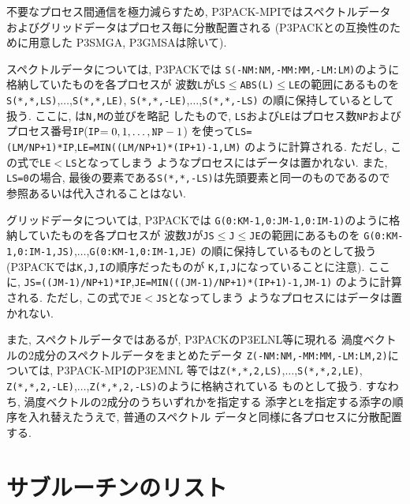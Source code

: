 \documentclass[a4j,fleqn]{jarticle}
\begin{document}
不要なプロセス間通信を極力減らすため, P3PACK-MPIではスペクトルデータ
およびグリッドデータはプロセス毎に分散配置される
(P3PACKとの互換性のために用意した P3SMGA, P3GMSAは除いて).

スペクトルデータについては, P3PACKでは
{\tt S(-NM:NM,-MM:MM,-LM:LM)}のように格納していたものを各プロセスが
波数{\tt L}が{\tt LS}$\le${\tt ABS(L)}$\le${\tt LE}の範囲にあるものを
{\tt S(*,*,LS)},$\ldots$,{\tt S(*,*,LE)},
{\tt S(*,*,-LE)},$\ldots$,{\tt S(*,*,-LS)}
の順に保持しているとして扱う. ここに, {\tt *}は{\tt N,M}の並びを略記
したもので, {\tt LS}および{\tt LE}はプロセス数{\tt NP}および
プロセス番号{\tt IP}({\tt IP}$=0,1,\ldots,{\tt NP}-1$)
を使って{\tt LS=(LM/NP+1)*IP},{\tt LE=MIN((LM/NP+1)*(IP+1)-1,LM)}
のように計算される. ただし, この式で{\tt LE}$<${\tt LS}となってしまう
ようなプロセスにはデータは置かれない. また, {\tt LS=0}の場合, 
最後の要素である{\tt S(*,*,-LS)}は先頭要素と同一のものであるので
参照あるいは代入されることはない.

グリッドデータについては, P3PACKでは
{\tt G(0:KM-1,0:JM-1,0:IM-1)}のように格納していたものを各プロセスが
波数{\tt J}が{\tt JS}$\le${\tt J}$\le${\tt JE}の範囲にあるものを
{\tt G(0:KM-1,0:IM-1,JS)},$\ldots$,{\tt G(0:KM-1,0:IM-1,JE)}
の順に保持しているものとして扱う(P3PACKでは{\tt K,J,I}の順序だったものが
{\tt K,I,J}になっていることに注意).
ここに,
{\tt JS=((JM-1)/NP+1)*IP},{\tt JE=MIN(((JM-1)/NP+1)*(IP+1)-1,JM-1)}
のように計算される. ただし, この式で{\tt JE}$<${\tt JS}となってしまう
ようなプロセスにはデータは置かれない.

また, スペクトルデータではあるが, P3PACKのP3ELNL等に現れる
渦度ベクトルの2成分のスペクトルデータをまとめたデータ
{\tt Z(-NM:NM,-MM:MM,-LM:LM,2)}については, P3PACK-MPIのP3EMNL
等では{\tt Z(*,*,2,LS)},$\ldots$,{\tt S(*,*,2,LE)},
{\tt Z(*,*,2,-LE)},$\ldots$,{\tt Z(*,*,2,-LS)}のように格納されている
ものとして扱う. すなわち, 渦度ベクトルの2成分のうちいずれかを指定する
添字と{\tt L}を指定する添字の順序を入れ替えたうえで, 普通のスペクトル
データと同様に各プロセスに分散配置する.


\section{サブルーチンのリスト}
\end{document}
